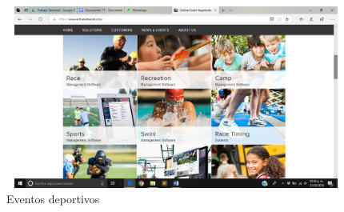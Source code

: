 	\pagebreak
	
	\begin{figure}[ht]
		\centering
		\includegraphics[width=12cm, height=6cm]{Imagenes/Aplicaciones/AN2.png}
		\caption{Eventos deportivos}
	\end{figure}
	
	
